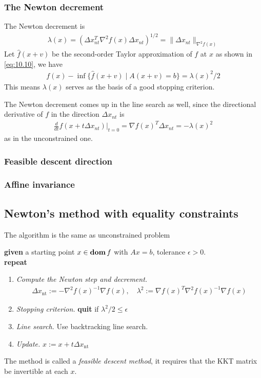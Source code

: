 \subsubsection{The Newton decrement}
The Newton decrement is
\begin{align}
  \lambda(x)=(\Delta x_{nt}^T\nabla^2f(x)\Delta x_{nt})^{1/2}=\|\Delta x_{nt}\|_{\nabla^2f(x)}\label{eq:10.12}
\end{align}
Let $\hat{f}(x+v)$ be the second-order Taylor approximation of $f$ at $x$ as shown in \eqref{eq:10.10}, we have
\begin{align}
  f(x)-\inf\{\hat{f}(x+v)\mid A(x+v)=b\}=\lambda(x)^2/2
\end{align}
This means $\lambda(x)$ serves as the basis of a good stopping criterion.\par
The Newton decrement comes up in the line search as well, since the directional derivative of $f$ in the direction $\Delta x_{nt}$ is
\begin{align}
  \frac{d}{dt}f(x+t\Delta x_{nt})\bigg|_{t=0}=\nabla f(x)^T\Delta x_{nt}=-\lambda(x)^2\label{eq:10.14}
\end{align}
as in the unconstrained one.

\subsubsection{Feasible descent direction}
\subsubsection{Affine invariance}

\subsection{Newton's method with equality constraints}
The algorithm is the same as unconstrained problem
\begin{algorithm}
  $ $\\
  \textbf{given} a starting point $x\in\mathop{\bf dom} f$ with $Ax=b$, tolerance $\epsilon>0$.\\
  \textbf{repeat}
  \begin{enumerate}
    \item \textit{Compute the Newton step and decrement.}
    \begin{align*}
      \Delta x_{\text{nt}}:=-\nabla^2f(x)^{-1}\nabla f(x),\quad\lambda^2:=\nabla f(x)^T\nabla^2f(x)^{-1}\nabla f(x)
    \end{align*}
    \item \textit{Stopping criterion.} \textbf{quit} if $\lambda^2/2\le\epsilon$
    \item \textit{Line search.} Use backtracking line search.
    \item \textit{Update.} $x:=x+t\Delta x_{\text{nt}}$
  \end{enumerate}
\end{algorithm}
The method is called a \textit{feasible descent method}, it requires that the KKT matrix be invertible at each $x$.

